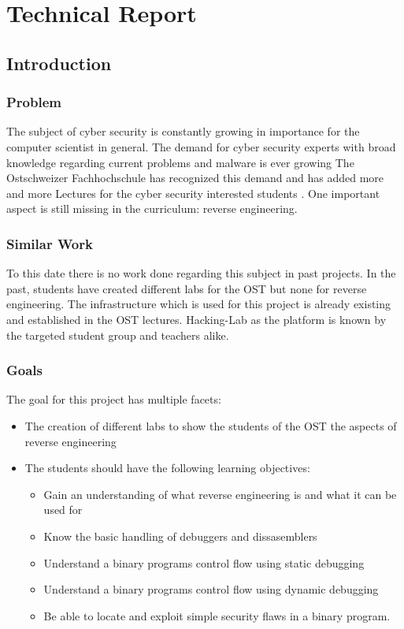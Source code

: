 \chapter{Technical Report}
\section{Introduction}
\subsection{Problem}
The subject of cyber security is constantly growing in importance for the computer scientist in general. The demand for cyber security experts with broad knowledge regarding current problems and malware is ever growing \cite{cybercrime-mag} The Ostschweizer Fachhochschule has recognized this demand and has added more and more Lectures for the cyber security interested students \cite{ost-cybersec}. One important aspect is still missing in the curriculum: reverse engineering.

\subsection{Similar Work}
To this date there is no work done regarding this subject in past projects. In the past, students have created different labs for the OST but none for reverse engineering. The infrastructure which is used for this project is already existing and established in the OST lectures. Hacking-Lab as the platform is known by the targeted student group and teachers alike. 

\subsection{Goals}
The goal for this project has multiple facets:
\begin{itemize}
    \item The creation of different labs to show the students of the OST the aspects of reverse engineering
    \item The students should have the following learning objectives:
    \begin{itemize}
        \item Gain an understanding of what reverse engineering is and what it can be used for
        \item Know the basic handling of debuggers and dissasemblers
        \item Understand a binary programs control flow using static debugging
        \item Understand a binary programs control flow using dynamic debugging
        \item Be able to locate and exploit simple security flaws in a binary program.
    \end{itemize}
\end{itemize}

